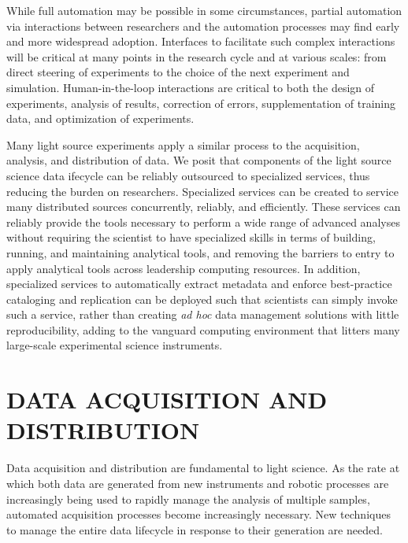 \documentclass{aip-cp}
\begin{document}
While full automation may be possible in some circumstances, partial
automation via interactions between researchers and the automation processes
may find early and more widespread adoption. Interfaces to facilitate such
complex interactions will be critical at many points in the research cycle and at
various scales: from direct steering of experiments to the choice of the next
experiment and simulation. Human-in-the-loop interactions are critical to both
the design of experiments, analysis of results, correction of errors,
supplementation of training data, and optimization of experiments.

Many light source experiments apply a similar process to the acquisition,
analysis, and  distribution of data. We posit that components of the light
source science data  ifecycle can be reliably outsourced to specialized
services, thus reducing the burden on  researchers. Specialized services can be
created to service many distributed sources concurrently, reliably, and efficiently.
These services can reliably provide the tools necessary to  perform a wide
range of advanced analyses without requiring the scientist to have specialized
skills in terms of building, running, and maintaining analytical tools, and
removing the barriers to entry to apply analytical tools across leadership
computing resources. In addition, specialized  services to automatically
extract metadata and enforce best-practice cataloging and replication can be
deployed such that scientists can simply invoke such a service, rather than
creating \emph{ad hoc} data management solutions with little reproducibility, adding
to the vanguard computing environment that litters many large-scale
experimental science instruments.


\section{DATA ACQUISITION AND DISTRIBUTION}

Data acquisition and distribution are fundamental to light science. As the rate at which both data 
are generated from new instruments and robotic processes are increasingly being used to rapidly 
manage 
the analysis of multiple samples, automated acquisition processes become increasingly necessary. New 
techniques to manage the entire data lifecycle in response to their generation are needed.
\end{document}
